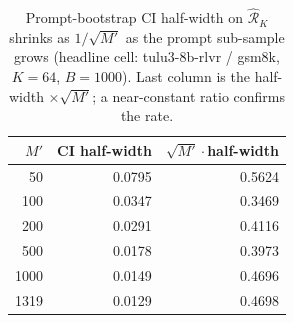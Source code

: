 \begin{table}[htbp]
\centering
\small
\caption{Prompt-bootstrap CI half-width on $\hat{\mathcal R}_K$ shrinks as $1/\sqrt{M'}$ as the prompt sub-sample grows (headline cell: tulu3-8b-rlvr / gsm8k, $K{=}64$, $B{=}1000$). Last column is the half-width $\times\sqrt{M'}$; a near-constant ratio confirms the rate.}
\label{tab:appendix_M_convergence}
\begin{tabular}{rrr}
\toprule
$M'$ & CI half-width & $\sqrt{M'}\cdot$half-width \\
\midrule
50 & 0.0795 & 0.5624 \\
100 & 0.0347 & 0.3469 \\
200 & 0.0291 & 0.4116 \\
500 & 0.0178 & 0.3973 \\
1000 & 0.0149 & 0.4696 \\
1319 & 0.0129 & 0.4698 \\
\bottomrule
\end{tabular}
\end{table}